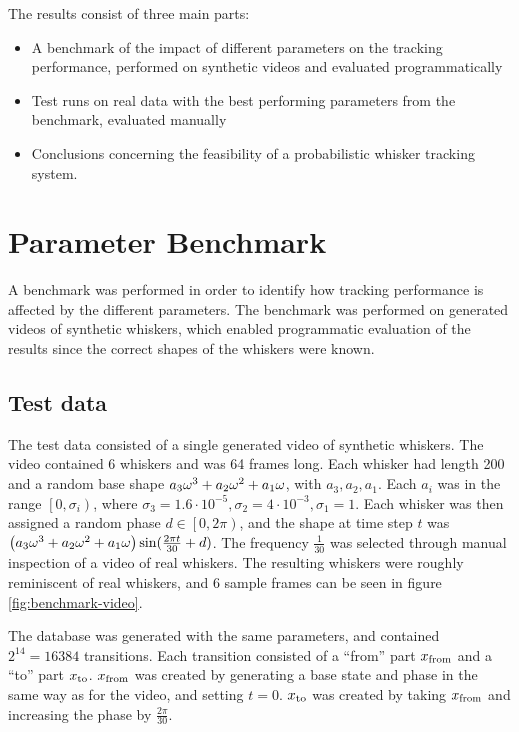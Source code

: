 The results consist of three main parts:
\begin{itemize}
\item A benchmark of the impact of different parameters on the
  tracking performance, performed on synthetic videos and evaluated
  programmatically
\item Test runs on real data with the best performing parameters from
  the benchmark, evaluated manually
\item Conclusions concerning the feasibility of a probabilistic
  whisker tracking system.
\end{itemize}

\section{Parameter Benchmark}

A benchmark was performed in order to identify how tracking
performance is affected by the different parameters. The benchmark was
performed on generated videos of synthetic whiskers, which enabled
programmatic evaluation of the results since the correct shapes of the
whiskers were known.

\subsection{Test data}
\label{sec:test-data}

The test data consisted of a single generated video of synthetic
whiskers. The video contained 6 whiskers and was 64 frames long. Each
whisker had length 200 and a random base shape $\Spline{\omega}$, with
$a_3, a_2, a_1$. Each $a_i$ was in the range $\left[0,
  \sigma_i\right)$, where $\sigma_3 = 1.6 \cdot 10^{-5}, \sigma_2 =
4\cdot 10^{-3}, \sigma_1 = 1$. Each whisker was then assigned a random
phase $d \in \left[0, 2\pi\right)$, and the shape at time step $t$ was
$\left(\Spline{\omega}\right) \sin(\frac{2\pi t}{30} + d)$. The
frequency $\frac{1}{30}$ was selected through manual inspection of a
video of real whiskers. The resulting whiskers were roughly
reminiscent of real whiskers, and 6 sample frames can be seen in
figure \ref{fig:benchmark-video}.

The database was generated with the same parameters, and contained
$2^{14} = 16384$ transitions. Each transition consisted of a ``from''
part $\tf$ and a ``to'' part $\tt$. $\tf$ was created by generating a
base state and phase in the same way as for the video, and setting
$t=0$. $\tt$ was created by taking $\tf$ and increasing the phase by
$\frac{2\pi}{30}$.

